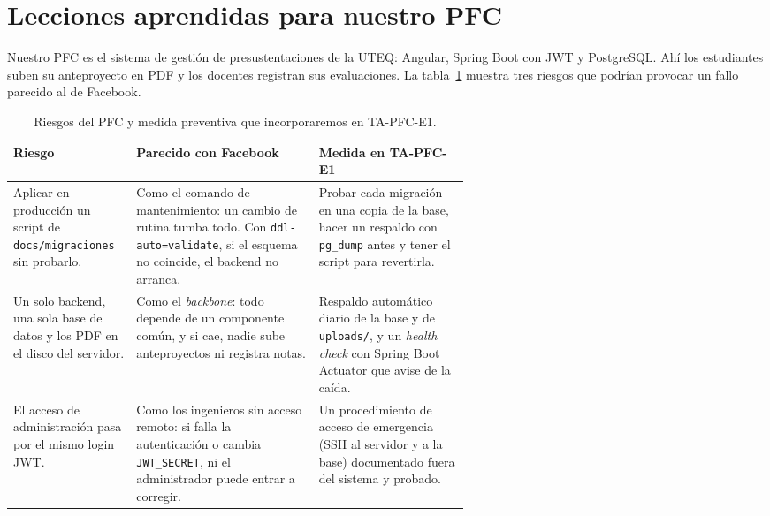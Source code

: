 \section{Lecciones aprendidas para nuestro PFC}

Nuestro PFC es el sistema de gestión de presustentaciones de la UTEQ: Angular, Spring Boot con JWT y PostgreSQL. Ahí los estudiantes suben su anteproyecto en PDF y los docentes registran sus evaluaciones. La tabla~\ref{tab:riesgos} muestra tres riesgos que podrían provocar un fallo parecido al de Facebook.

\begin{table}[H]
\centering
\footnotesize
\renewcommand{\arraystretch}{1.1}
\caption{Riesgos del PFC y medida preventiva que incorporaremos en TA-PFC-E1.}
\label{tab:riesgos}
\begin{tabularx}{\linewidth}{@{}>{\raggedright\arraybackslash}p{0.27\linewidth} >{\raggedright\arraybackslash}X >{\raggedright\arraybackslash}p{0.33\linewidth}@{}}
\toprule
\textbf{Riesgo} & \textbf{Parecido con Facebook} & \textbf{Medida en TA-PFC-E1} \\
\midrule
Aplicar en producción un script de \texttt{docs/migraciones} sin probarlo. & Como el comando de mantenimiento: un cambio de rutina tumba todo. Con \texttt{ddl-auto=validate}, si el esquema no coincide, el backend no arranca. & Probar cada migración en una copia de la base, hacer un respaldo con \texttt{pg\_dump} antes y tener el script para revertirla. \\
Un solo backend, una sola base de datos y los PDF en el disco del servidor. & Como el \emph{backbone}: todo depende de un componente común, y si cae, nadie sube anteproyectos ni registra notas. & Respaldo automático diario de la base y de \texttt{uploads/}, y un \emph{health check} con Spring Boot Actuator que avise de la caída. \\
El acceso de administración pasa por el mismo login JWT. & Como los ingenieros sin acceso remoto: si falla la autenticación o cambia \texttt{JWT\_SECRET}, ni el administrador puede entrar a corregir. & Un procedimiento de acceso de emergencia (SSH al servidor y a la base) documentado fuera del sistema y probado. \\
\bottomrule
\end{tabularx}
\end{table}
